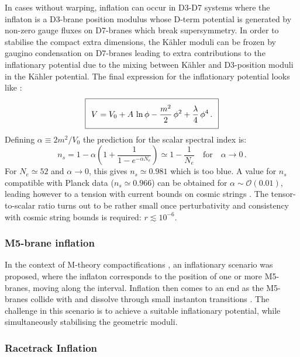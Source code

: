 In cases without warping, inflation can occur in D3-D7 systems where the inflaton is a D3-brane position modulus whose D-term potential is generated by non-zero gauge fluxes on D7-branes which break supersymmetry. In order to stabilise the compact extra dimensions, the K\"ahler moduli can be frozen by gaugino condensation on D7-branes leading to extra contributions to the inflationary potential due to the mixing between K\"ahler and D3-position moduli in the K\"ahler potential. The final expression for the inflationary potential looks like \cite{Dasgupta:2002ew,Dasgupta:2004dw,Burgess:2008ir}: 
\begin{equation}
\setlength\fboxsep{0.25cm}
\setlength\fboxrule{0.4pt}
\boxed{
V = V_0 + A\,\ln\phi -\frac{m^2}{2}\, \phi^2+\frac{\lambda}{4}\,\phi^4\,.
}
\end{equation}
Defining $\alpha\equiv 2 m^2/V_0$ the prediction for the scalar spectral index is:
\begin{equation}
n_s=1-\alpha\left(1+\frac{1}{1-e^{-\alpha N_e}}\right)\simeq 1-\frac{1}{N_e} \quad\text{for}\quad \alpha \to 0\,.
\end{equation}
For $N_e\simeq 52$ and $\alpha\to 0$, this gives $n_s\simeq 0.981$ which is too blue. A value for $n_s$ compatible with Planck data ($n_s\simeq 0.966$) can be obtained for $\alpha\sim\mathcal{O}(0.01)$, leading however to a tension with current bounds on cosmic strings \cite{Haack:2008yb}. The tensor-to-scalar ratio turns out to be rather small once perturbativity and consistency with cosmic string bounds is required: $r\lesssim 10^{-6}$.

\subsubsection*{M5-brane inflation} 

In the context of M-theory compactifications \cite{Horava:1995qa,Horava:1996ma,Witten:1996mz}, an inflationary scenario was proposed, where the inflaton corresponds to the position of one or more M5-branes, moving along the interval. Inflation then comes to an  end as the M5-branes collide with and dissolve through small instanton transitions \cite{Buchbinder:2004nt,Becker:2005sg,Krause:2007jr}. The challenge in this scenario is to achieve a suitable inflationary potential, while simultaneously stabilising the geometric moduli. 

\subsubsection*{Racetrack Inflation}

